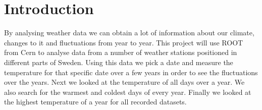 \documentclass[../main.tex]{subfiles}
\begin{document}
	\section{Introduction}
		By analysing weather data we can obtain a lot of information about our climate, changes to it and fluctuations from year to year. 
		This project will use ROOT from Cern to analyse data from a number of weather stations positioned in different parts of Sweden. Using 
		this data we pick a date and measure the temperature for that specific date over a few years in order to see the fluctuations over the years. 
		Next we looked at the temperature of all days over a year. We also search for the warmest and coldest days of every year. 
		Finally we looked at the highest temperature of a year for all recorded datasets.
\end{document}
